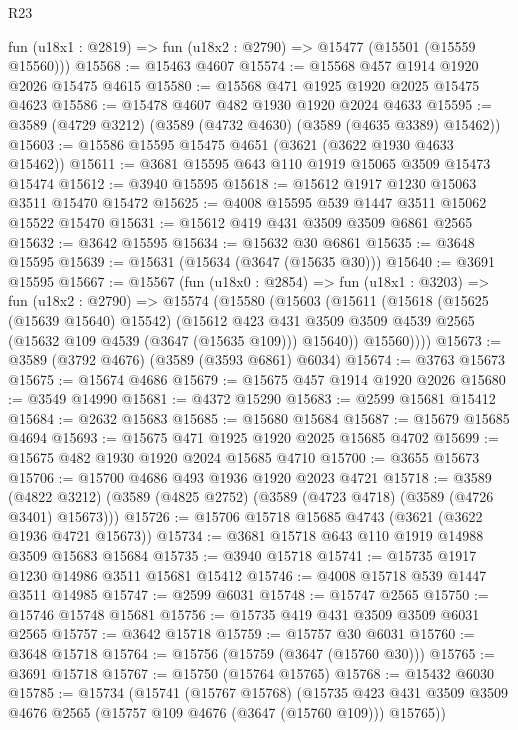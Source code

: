 \begin{lexlean}{R23}
\begin{coremodule}
    fun (u18x1 : @2819) => fun (u18x2 : @2790) => @15477 (@15501 (@15559 @15560)))
@15568 := @15463 @4607
@15574 := @15568 @457 @1914 @1920 @2026 @15475 @4615
@15580 := @15568 @471 @1925 @1920 @2025 @15475 @4623
@15586 := @15478 @4607 @482 @1930 @1920 @2024 @4633
@15595 := @3589 (@4729 @3212) (@3589 (@4732 @4630) (@3589 (@4635 @3389) @15462))
@15603 := @15586 @15595 @15475 @4651 (@3621 (@3622 @1930 @4633 @15462))
@15611 := @3681 @15595 @643 @110 @1919 @15065 @3509 @15473 @15474
@15612 := @3940 @15595
@15618 := @15612 @1917 @1230 @15063 @3511 @15470 @15472
@15625 := @4008 @15595 @539 @1447 @3511 @15062 @15522 @15470
@15631 := @15612 @419 @431 @3509 @3509 @6861 @2565
@15632 := @3642 @15595
@15634 := @15632 @30 @6861
@15635 := @3648 @15595
@15639 := @15631 (@15634 (@3647 (@15635 @30)))
@15640 := @3691 @15595
@15667 := @15567
    (fun (u18x0 : @2854) =>
    fun (u18x1 : @3203) =>
    fun (u18x2 : @2790) =>
    @15574
      (@15580
        (@15603
          (@15611
            (@15618
              (@15625 (@15639 @15640) @15542)
              (@15612
                @423
                @431
                @3509
                @3509
                @4539
                @2565
                (@15632 @109 @4539 (@3647 (@15635 @109)))
                @15640))
            @15560))))
@15673 := @3589 (@3792 @4676) (@3589 (@3593 @6861) @6034)
@15674 := @3763 @15673
@15675 := @15674 @4686
@15679 := @15675 @457 @1914 @1920 @2026
@15680 := @3549 @14990
@15681 := @4372 @15290
@15683 := @2599 @15681 @15412
@15684 := @2632 @15683
@15685 := @15680 @15684
@15687 := @15679 @15685 @4694
@15693 := @15675 @471 @1925 @1920 @2025 @15685 @4702
@15699 := @15675 @482 @1930 @1920 @2024 @15685 @4710
@15700 := @3655 @15673
@15706 := @15700 @4686 @493 @1936 @1920 @2023 @4721
@15718 := @3589
    (@4822 @3212)
    (@3589 (@4825 @2752) (@3589 (@4723 @4718) (@3589 (@4726 @3401) @15673)))
@15726 := @15706 @15718 @15685 @4743 (@3621 (@3622 @1936 @4721 @15673))
@15734 := @3681 @15718 @643 @110 @1919 @14988 @3509 @15683 @15684
@15735 := @3940 @15718
@15741 := @15735 @1917 @1230 @14986 @3511 @15681 @15412
@15746 := @4008 @15718 @539 @1447 @3511 @14985
@15747 := @2599 @6031
@15748 := @15747 @2565
@15750 := @15746 @15748 @15681
@15756 := @15735 @419 @431 @3509 @3509 @6031 @2565
@15757 := @3642 @15718
@15759 := @15757 @30 @6031
@15760 := @3648 @15718
@15764 := @15756 (@15759 (@3647 (@15760 @30)))
@15765 := @3691 @15718
@15767 := @15750 (@15764 @15765)
@15768 := @15432 @6030
@15785 := @15734
    (@15741
      (@15767 @15768)
      (@15735 @423 @431 @3509 @3509 @4676 @2565 (@15757 @109 @4676 (@3647 (@15760 @109))) @15765))

\end{coremodule}
\end{lexlean}
